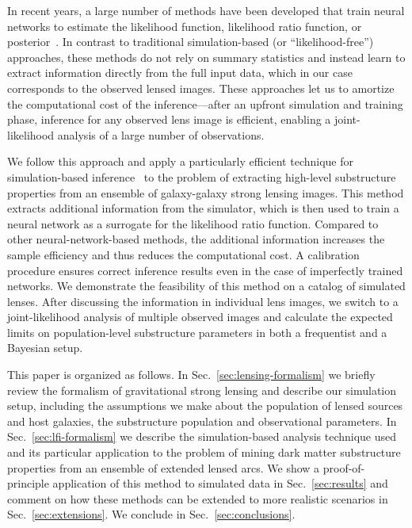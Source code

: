 \documentclass[twocolumn]{aastex62}
\begin{document}
In recent years, a large number of methods have been developed that train neural networks to estimate the likelihood function, likelihood ratio function, or posterior~\citep{2012arXiv1212.1479F, 2014arXiv1410.8516D, 2015arXiv150203509G, 2015arXiv150505770J, Cranmer:2015bka,  2016arXiv160206701P, 2016arXiv160502226U, 2016arXiv160508803D, 2016arXiv160605328V, 2016arXiv160903499V, 2016arXiv160106759V, 2016arXiv161110242D, NIPS2016_6084, 2017arXiv170208896T, 2017arXiv170507057P, 2017arXiv170707113L, 2017arXiv171101861L, gutmann2017likelihood, 2018arXiv180400779H, 2018arXiv180507226P, 2018arXiv180509294L, DBLP:journals/corr/abs-1806-07366, 2018arXiv180703039K, 2018arXiv181001367G, 2018arXiv181009899D, Hermans:2019ioj, Alsing:2019xrx}.  In contrast to traditional simulation-based (or ``likelihood-free'') approaches, these methods do not rely on summary statistics and instead learn to extract information directly from the full input data, which in our case corresponds to the observed lensed images. These approaches let us to amortize the computational cost of the inference---after an upfront simulation and training phase, inference for any observed lens image is efficient, enabling a joint-likelihood analysis of a large number of observations.

We follow this approach and apply a particularly efficient technique for simulation-based inference~\citep{1805.00013, 1805.00020, 1805.12244, Stoye:2018ovl} to the problem of extracting high-level substructure properties from an ensemble of galaxy-galaxy strong lensing images. This method extracts additional information from the simulator, which is then used to train a neural network as a surrogate for the likelihood ratio function. Compared to other neural-network-based methods, the additional information increases the sample efficiency and thus reduces the computational cost. A calibration procedure ensures correct inference results even in the case of imperfectly trained networks. We demonstrate the feasibility of this method on a catalog of simulated lenses. After discussing the information in individual lens images, we switch to a joint-likelihood analysis of multiple observed images and calculate the expected limits on population-level substructure parameters in both a frequentist and a Bayesian setup.

This paper is organized as follows. In Sec.~\ref{sec:lensing-formalism} we briefly review the formalism of gravitational strong lensing and describe our simulation setup, including the assumptions we make about the population of lensed sources and host galaxies, the substructure population and observational parameters. In Sec.~\ref{sec:lfi-formalism} we describe the simulation-based analysis technique used and its particular application to the problem of mining dark matter substructure properties from an ensemble of extended lensed arcs. We show a proof-of-principle application of this method to simulated data in Sec.~\ref{sec:results} and comment on how these methods can be extended to more realistic scenarios in Sec.~\ref{sec:extensions}. We conclude in Sec.~\ref{sec:conclusions}.
\end{document}
